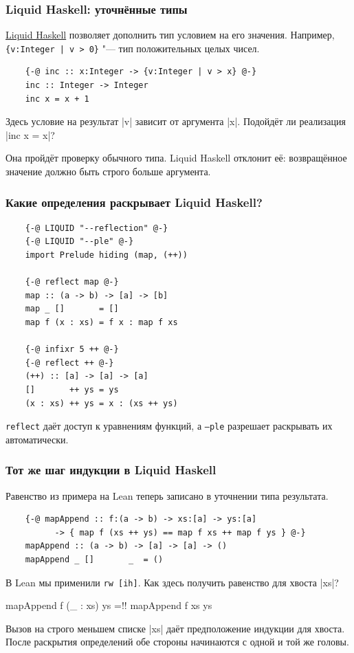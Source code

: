 \documentclass[11pt]{beamer}
\begin{document}
\begin{frame}[fragile]
  \frametitle{Liquid Haskell: уточнённые типы}
  \href{https://ucsd-progsys.github.io/liquidhaskell/}{Liquid Haskell} позволяет дополнить тип условием на его значения. Например, \texttt{\{v:Integer | v > 0\}} "--- тип положительных целых чисел.
  \begin{verbatim}
    {-@ inc :: x:Integer -> {v:Integer | v > x} @-}
    inc :: Integer -> Integer
    inc x = x + 1
  \end{verbatim}
  Здесь условие на результат \haskinline|v| зависит от аргумента \haskinline|x|. Подойдёт ли реализация \haskinline|inc x = x|? \pause

  Она пройдёт проверку обычного типа. Liquid Haskell отклонит её: возвращённое значение должно быть строго больше аргумента.
\end{frame}

\begin{frame}[fragile]
  \frametitle{Какие определения раскрывает Liquid Haskell?}
  \begin{verbatim}
    {-@ LIQUID "--reflection" @-}
    {-@ LIQUID "--ple" @-}
    import Prelude hiding (map, (++))

    {-@ reflect map @-}
    map :: (a -> b) -> [a] -> [b]
    map _ []       = []
    map f (x : xs) = f x : map f xs

    {-@ infixr 5 ++ @-}
    {-@ reflect ++ @-}
    (++) :: [a] -> [a] -> [a]
    []       ++ ys = ys
    (x : xs) ++ ys = x : (xs ++ ys)
  \end{verbatim}
  \texttt{reflect} даёт доступ к уравнениям функций, а \texttt{--ple} разрешает раскрывать их автоматически.
\end{frame}

\begin{frame}[fragile]
  \frametitle{Тот же шаг индукции в Liquid Haskell}
  Равенство из примера на Lean теперь записано в уточнении типа результата.
  \begin{verbatim}
    {-@ mapAppend :: f:(a -> b) -> xs:[a] -> ys:[a]
          -> { map f (xs ++ ys) == map f xs ++ map f ys } @-}
    mapAppend :: (a -> b) -> [a] -> [a] -> ()
    mapAppend _ []       _  = ()
  \end{verbatim}
  В Lean мы применили \texttt{rw [ih]}. Как здесь получить равенство для хвоста \haskinline|xs|?
  \begin{haskellsmall}
    mapAppend f (_ : xs) ys =!\pause! mapAppend f xs ys
  \end{haskellsmall}
  Вызов на строго меньшем списке \haskinline|xs| даёт предположение индукции для хвоста. После раскрытия определений обе стороны начинаются с одной и той же головы.
\end{frame}
\end{document}
